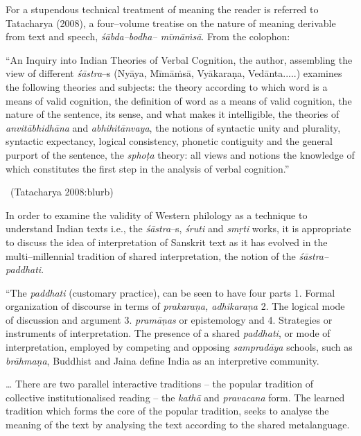 For a stupendous technical treatment of meaning the reader is referred to Tatacharya (2008), a four–volume treatise on the nature of meaning derivable from text and speech, \textit{śābda–bodha– mīmāṁsā}. From the colophon:

\begin{myquote}
“An Inquiry into Indian Theories of Verbal Cognition, the author, assembling the view of different \textit{śāstra}–s (Nyāya, Mīmāṁsā, Vyākaraṇa, Vedānta.....) examines the following theories and subjects: the theory according to which word is a means of valid cognition, the definition of word as a means of valid cognition, the nature of the sentence, its sense, and what makes it intelligible, the theories of \textit{anvitābhidhāna} and \textit{abhihitānvaya}, the notions of syntactic unity and plurality, syntactic expectancy, logical consistency, phonetic contiguity and the general purport of the sentence, the \textit{sphoṭa} theory: all views and notions the knowledge of which constitutes the first step in the analysis of verbal cognition.” 

~\hfill (Tatacharya 2008:blurb)
\end{myquote}

In order to examine the validity of Western philology as a technique to understand Indian texts i.e., the \textit{śāstra}–s, \textit{śruti} and \textit{smṛti} works, it is appropriate to discuss the idea of interpretation of Sanskrit text as it has evolved in the multi–millennial tradition of shared interpretation, the notion of the \textit{śāstra–paddhati}.

\begin{myquote}
“The \textit{paddhati} (customary practice), can be seen to have four parts 1. Formal organization of discourse in terms of \textit{prakaraṇa, adhikaraṇa} 2. The logical mode of discussion and argument 3. \textit{pramāṇas} or epistemology and 4. Strategies or instruments of interpretation. The presence of a shared \textit{paddhati}, or mode of interpretation, employed by competing and opposing \textit{sampradāya} schools, such as \textit{brāhmaṇa}, Buddhist and Jaina define India as an interpretive community.
\end{myquote}

\begin{myquote}
… There are two parallel interactive traditions – the popular tradition of collective institutionalised reading – the \textit{kathā} and \textit{pravacana} form. The learned tradition which forms the core of the popular tradition, seeks to analyse the meaning of the text by analysing the text according to the shared metalanguage.
\end{myquote}

